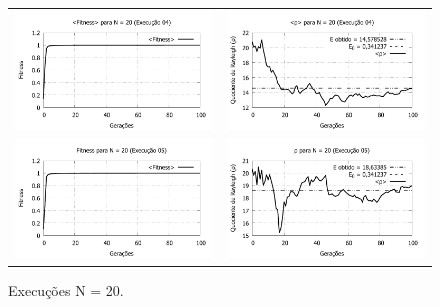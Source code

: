 \begin{figure}[phtb]
\begin{tabular}{@{}cc@{}}
		\includegraphics[width=.40\textwidth]{figs/resultados/N20_04_fitness.pdf} &
    \includegraphics[width=.40\textwidth]{figs/resultados/N20_04_rho.pdf}   \\
		\includegraphics[width=.40\textwidth]{figs/resultados/N20_05_fitness.pdf} &
    \includegraphics[width=.40\textwidth]{figs/resultados/N20_05_rho.pdf}
  \end{tabular}
  \caption{Execuções N = 20.}
	\label{fig:execucoes_N20}
\end{figure}

